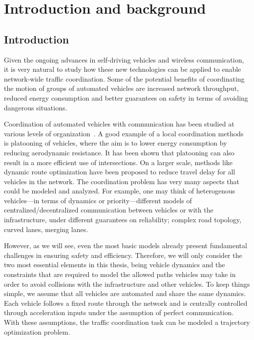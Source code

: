 \documentclass[a4paper]{report}
\theoremstyle{definition}
\theoremstyle{plain}
\begin{document}


\chapter{Introduction and background}

\section{Introduction}


Given the ongoing advances in self-driving vehicles and wireless communication,
it is very natural to study how these new technologies can be applied to enable
network-wide traffic coordination.
%
Some of the potential benefits of coordinating the motion of groups of automated
vehicles are increased network throughput, reduced energy consumption and better
guarantees on safety in terms of avoiding dangerous situations.

Coordination of automated vehicles with communication has been studied at
various levels of organization~\cite{marianiCoordinationAutonomousVehicles2022}.
A good example of a local coordination methods is platooning of vehicles, where
the aim is to lower energy consumption by reducing aerodynamic resistance. It
has been shown that platooning can also result in a more efficient use of
intersections. On a larger scale, methods like dynamic route optimization have
been proposed to reduce travel delay for all vehicles in the network.
%
The coordination problem has very many aspects that could be modeled and
analyzed. For example, one may think of heterogenous vehicles---in terms of
dynamics or priority---different models of centralized/decentralized
communication between vehicles or with the infrastructure, under different
guarantees on reliability; complex road topology, curved lanes, merging lanes.

However, as we will see, even the most basic models already present fundamental
challenges in ensuring safety and efficiency.
%
Therefore, we will only consider the two most essential elements in this thesis,
being vehicle dynamics and the constraints that are required to model the
allowed paths vehicles may take in order to avoid collisions with the
infrastructure and other vehicles.
%
To keep things simple, we assume that all vehicles are automated and share the
same dynamics.
%
Each vehicle follows a fixed route through the network and is centrally
controlled through acceleration inputs under the assumption of perfect
communication.
%
With these assumptions, the traffic coordination task can be modeled a
trajectory optimization problem.
\end{document}
